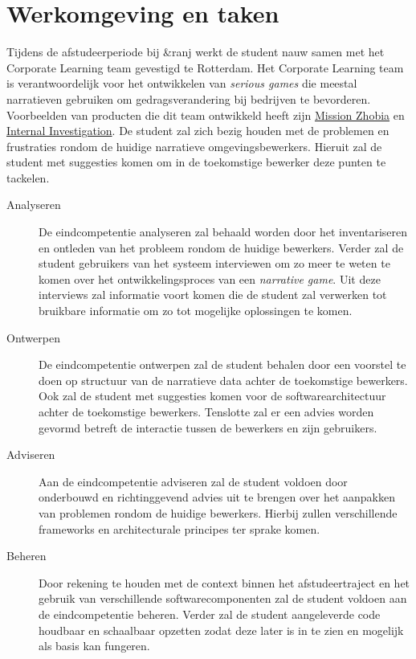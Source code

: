 \documentclass{report}
\newcommand{\organisation}{\&ranj}
\begin{document}
\section{Werkomgeving en taken}
Tijdens de afstudeerperiode bij \organisation{} werkt de student nauw samen met het Corporate Learning team gevestigd te Rotterdam. Het Corporate Learning team is verantwoordelijk voor het ontwikkelen van \emph{serious games} die meestal narratieven gebruiken om gedragsverandering bij bedrijven te bevorderen. Voorbeelden van producten die dit team ontwikkeld heeft zijn \href{https://ranj.com/projects/corporate/development#mission-zhobia}{Mission Zhobia} en \href{https://ranj.nl/projects/corporate/development#internal-investigation-game}{Internal Investigation}. De student zal zich bezig houden met de problemen en frustraties rondom de huidige narratieve omgevingsbewerkers. Hieruit zal de student met suggesties komen om in de toekomstige bewerker deze punten te tackelen.
\begin{description} %
\item[Analyseren] De eindcompetentie analyseren zal behaald worden door het inventariseren en ontleden van het probleem rondom de huidige bewerkers. Verder zal de student gebruikers van het systeem interviewen om zo meer te weten te komen over het ontwikkelingsproces van een \emph{narrative game}. Uit deze interviews zal informatie voort komen die de student zal verwerken tot bruikbare informatie om zo tot mogelijke oplossingen te komen.
\item[Ontwerpen] De eindcompetentie ontwerpen zal de student behalen door een voorstel te doen op structuur van de narratieve data achter de toekomstige bewerkers. Ook zal de student met suggesties komen voor de softwarearchitectuur achter de toekomstige bewerkers. Tenslotte zal er een advies worden gevormd betreft de interactie tussen de bewerkers en zijn gebruikers.
\item[Adviseren] Aan de eindcompetentie adviseren zal de student voldoen door onderbouwd en richtinggevend advies uit te brengen over het aanpakken van problemen rondom de huidige bewerkers. Hierbij zullen verschillende frameworks en architecturale principes ter sprake komen.
\item[Beheren] Door rekening te houden met de context binnen het afstudeertraject en het gebruik van verschillende softwarecomponenten zal de student voldoen aan de eindcompetentie beheren. Verder zal de student aangeleverde code houdbaar en schaalbaar opzetten zodat deze later is in te zien en mogelijk als basis kan fungeren.
\end{description}
\end{document}
